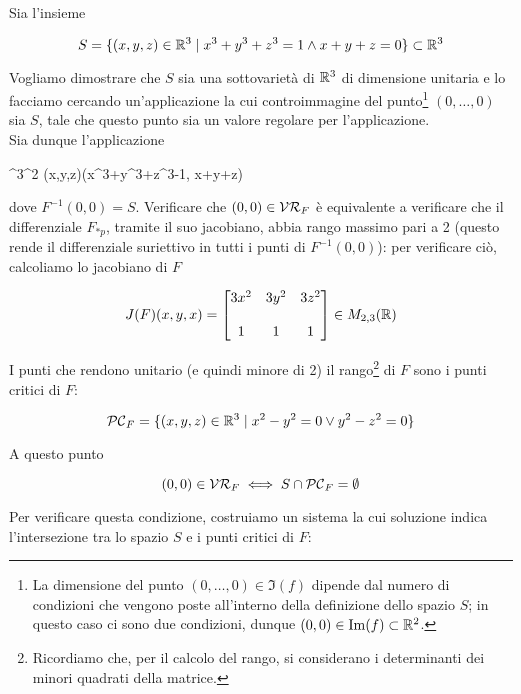 Sia l'insieme

\begin{equation}
	S = \{ (x,y,z) \in \mathbb{R}^{3} \mid x^{3} + y^{3} + z^{3} = 1 \wedge x+y+z=0 \} \subset \mathbb{R}^{3}
\end{equation}

Vogliamo dimostrare che $ S $ sia una sottovarietà di $ \mathbb{R}^{3} $ di dimensione unitaria e lo facciamo cercando un'applicazione la cui controimmagine del punto\footnote{%
	La dimensione del punto $ (0,\dots,0) \in \Im(f) $ dipende dal numero di condizioni che vengono poste all'interno della definizione dello spazio $ S $; in questo caso ci sono due condizioni, dunque $ (0,0) \in \Im(f) \subset \mathbb{R}^{2} $.%
} $ (0,\dots,0) $ sia $ S $, tale che questo punto sia un valore regolare per l'applicazione.\\
Sia dunque l'applicazione

	{\R^{3}}{\R^{2}}
	{(x,y,z)}{(x^{3}+y^{3}+z^{3}-1, x+y+z)}

dove $ F^{-1}(0,0) = S $. Verificare che $ (0,0) \in \mathcal{VR}_{F} $ è equivalente a verificare che il differenziale $ F_{*p} $, tramite il suo jacobiano, abbia rango massimo pari a 2 (questo rende il differenziale suriettivo in tutti i punti di $ F^{-1}(0,0) $): per verificare ciò, calcoliamo lo jacobiano di $ F $

\begin{equation}
	J(F)(x,y,x) = \bmqty{ 3x^{2} & 3y^{2} & 3z^{2} \\\\ 1 & 1 & 1 }\in M_{2,3}(\R)
\end{equation}

I punti che rendono unitario (e quindi minore di 2) il rango\footnote{%
	Ricordiamo che, per il calcolo del rango, si considerano i determinanti dei minori quadrati della matrice.%
} di $ F $ sono i punti critici di $ F $:

\begin{equation}
	\mathcal{PC}_{F} = \{ (x,y,z) \in \mathbb{R}^{3} \mid x^{2}-y^{2}=0 \lor y^{2}-z^{2}=0 \}
\end{equation}

A questo punto

\begin{equation}
	(0,0) \in \mathcal{VR}_{F} \iff S \cap \mathcal{PC}_{F} = \emptyset
\end{equation}

Per verificare questa condizione, costruiamo un sistema la cui soluzione indica l'intersezione tra lo spazio $ S $ e i punti critici di $ F $:


